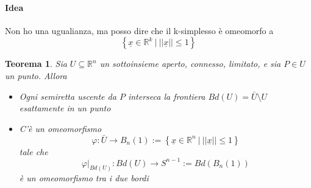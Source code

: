 \documentclass[a4paper]{report}
\newtheorem{theorem}{Teorema}
\newcommand{\R}{\ensuremath{\mathbb{R}}}
\newcommand{\ra}{\ensuremath{\rightarrow}}
\newcommand{\setst}[2]{\ensuremath{\left\{{#1}\ |\ {#2}\right\}}}
\begin{document}
\paragraph{Idea} Non ho una ugualianza, ma posso dire che il k-simplesso è omeomorfo a
\[
    \setst{\underline{x}\in\R^k}{||\underline{x}||\leq 1}
\]
\begin{theorem}
    Sia $U\subseteq\R^n$ un sottoinsieme aperto, connesso, limitato, e sia $P\in U$ un punto. Allora
    \begin{itemize}
        \item Ogni semiretta uscente da $P$ interseca la frontiera $Bd(U)=\bar{U}\setminus U$ esattamente in un punto
        \item C'è un omeomorfismo
              \[
                  \varphi:\bar{U}\ra B_n(1):=\setst{\underline{x}\in\R^n}{||\underline{x}||\leq 1}
              \]
              tale che
              \[
                  \left.\varphi\right|_{Bd(U)}:Bd(U)\ra S^{n-1}:=Bd(B_n(1))
              \]
              è un omeomorfismo tra i due bordi
    \end{itemize}
\end{theorem}
\end{document}
